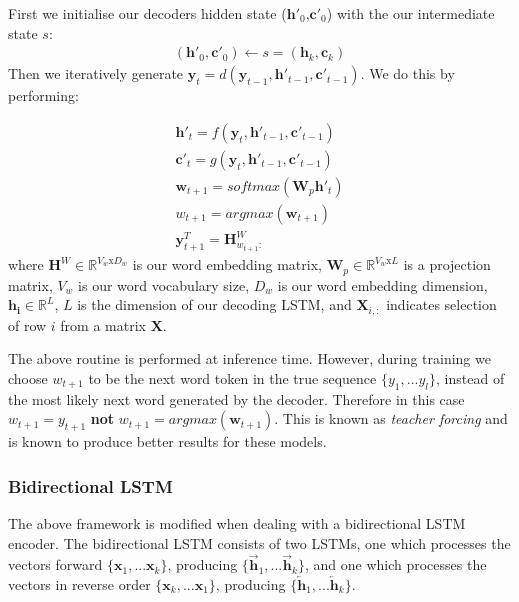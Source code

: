 First we initialise our decoders hidden state ($\textbf{h}'_0$,$\textbf{c}'_0$) with the our intermediate state $s$:
\begin{align}
    (\textbf{h}'_0, \textbf{c}'_0) \gets s = (\textbf{h}_k, \textbf{c}_k) \label{eq:s2s_assign}
\end{align}
Then we iteratively generate $\textbf{y}_t = d(\mathbf{y}_{t-1}, \mathbf{h}'_{t-1},\mathbf{c}'_{t-1} ) $. We do this by performing:

\begin{align}
    \textbf{h}'_t = f(\textbf{y}_t, \textbf{h}'_{t-1}, \textbf{c}'_{t-1}) \label{eq:s2syh}\\
    \textbf{c}'_t = g(\textbf{y}_t, \textbf{h}'_{t-1}, \textbf{c}'_{t-1}) \label{eq:s2syc} \\
    \textbf{w}_{t+1} = softmax(\textbf{W}_p\textbf{h}'_t) \label{eq:decoder_w}  \\
    w_{t+1} = argmax(\textbf{w}_{t+1})  \\
    \textbf{y}^T_{t+1} = \textbf{H}^W_{w_{t+1}:}  
\end{align}
where $\textbf{H}^W \in \mathbb{R}^{V_w\text{x}D_w}$ is our word embedding matrix, 
$\textbf{W}_p \in \mathbb{R}^{V_w\text{x}L}$ is a projection matrix, $V_w$ is our word vocabulary size, 
$D_w$ is our word embedding dimension, 
$\mathbf{h_i} \in \mathbb{R}^L$,
$L$ is the dimension of our decoding LSTM,
and $\textbf{X}_{i,:}$ indicates selection of row $i$ from a matrix \textbf{X}.

The above routine is performed at inference time. However, during training we choose   $w_{t+1} $ to be the next word token  in the true sequence $\{y_1,...y_l\}$, instead of the most likely next word generated by the decoder. Therefore in this case $w_{t+1}  = y_{t+1}$ \textbf{not}  $w_{t+1} = argmax(\textbf{w}_{t+1})$. This is known as \textit{teacher forcing} and is known to produce better results for these models\cite{Goodfellow:2016:DL:3086952}\cite{r._j._williams_learning_1989}.

\subsubsection{Bidirectional LSTM}

The above framework is modified when dealing with a bidirectional LSTM encoder. The bidirectional LSTM consists of two LSTMs, one which processes the vectors forward $\{\textbf{x}_1,...\textbf{x}_k\}$, producing  $\{\overrightarrow{\textbf{h}}_1,...\overrightarrow{\textbf{h}}_k\}$, and one which processes the vectors in reverse order  $\{\textbf{x}_k,...\textbf{x}_1\}$, producing  $\{\overleftarrow{\textbf{h}}_1,...\overleftarrow{\textbf{h}}_k\}$.

